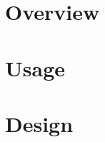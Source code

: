 \documentclass[notoc]{tufte-book}    %
\begin{document}
\chapter{Overview}


\chapter{Usage}

\chapter{Design}

\label{manualend}

% 
\end{document}
